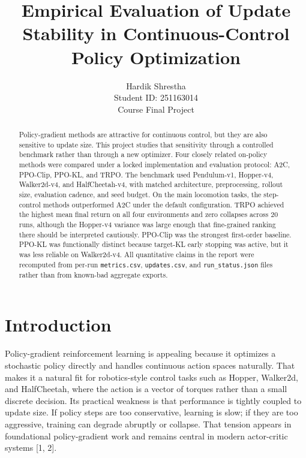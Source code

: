 \documentclass{article}
\title{Empirical Evaluation of Update Stability in Continuous-Control Policy Optimization}
\author{%
  Hardik Shrestha \\
  Student ID: 251163014 \\
  Course Final Project \\
}
\begin{document}
\maketitle

\begin{abstract}
Policy-gradient methods are attractive for continuous control, but they are also sensitive to update size. This project studies that sensitivity through a controlled benchmark rather than through a new optimizer. Four closely related on-policy methods were compared under a locked implementation and evaluation protocol: A2C, PPO-Clip, PPO-KL, and TRPO. The benchmark used Pendulum-v1, Hopper-v4, Walker2d-v4, and HalfCheetah-v4, with matched architecture, preprocessing, rollout size, evaluation cadence, and seed budget. On the main locomotion tasks, the step-control methods outperformed A2C under the default configuration. TRPO achieved the highest mean final return on all four environments and zero collapses across 20 runs, although the Hopper-v4 variance was large enough that fine-grained ranking there should be interpreted cautiously. PPO-Clip was the strongest first-order baseline. PPO-KL was functionally distinct because target-KL early stopping was active, but it was less reliable on Walker2d-v4. All quantitative claims in the report were recomputed from per-run \texttt{metrics.csv}, \texttt{updates.csv}, and \texttt{run\_status.json} files rather than from known-bad aggregate exports.
\end{abstract}

\section{Introduction}

Policy-gradient reinforcement learning is appealing because it optimizes a stochastic policy directly and handles continuous action spaces naturally. That makes it a natural fit for robotics-style control tasks such as Hopper, Walker2d, and HalfCheetah, where the action is a vector of torques rather than a small discrete decision. Its practical weakness is that performance is tightly coupled to update size. If policy steps are too conservative, learning is slow; if they are too aggressive, training can degrade abruptly or collapse. That tension appears in foundational policy-gradient work and remains central in modern actor-critic systems [1, 2].
\end{document}
